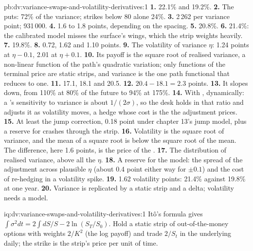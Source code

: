 \begin{solution}{pb:dv:variance-swaps-and-volatility-derivatives:1}
\textbf{1.} 22.1\% and 19.2\%.
\textbf{2.} The puts: 72\% of the variance; strikes below 80 alone 24\%.
\textbf{3.} 2\,262 per variance point; 931\,000.
\textbf{4.} 1.6 to 1.8 points, depending on the spacing.
\textbf{5.} 20.8\%.
\textbf{6.} 21.4\%: the calibrated model misses the surface's wings, which the strip weights heavily.
\textbf{7.} 19.8\%.
\textbf{8.} 0.72, 1.62 and 1.10 points.
\textbf{9.} The volatility of variance $\eta$: 1.24 points at $\eta-0.1$, 2.01 at $\eta+0.1$.
\textbf{10.} Its payoff is the square root of realised variance, a non-linear function of the path's quadratic
variation; only functions of the terminal price are static strips, and variance is the one path functional that
reduces to one.
\textbf{11.} 17.1, 18.1 and 20.5.
\textbf{12.} $20.4-18.1=2.3$ points.
\textbf{13.} It slopes down, from 110\% at 80\% of the future to 94\% at 175\%.
\textbf{14.} With , dynamically: a 's sensitivity to variance is about
$1/(2\sigma)$, so the desk holds  in that ratio and adjusts it as volatility moves, a hedge whose
cost is the  the adjustment prices.
\textbf{15.} At least the jump correction, 0.18 point under chapter 13's jump model, plus a reserve for crashes
through the strip.
\textbf{16.} Volatility is the square root of variance, and the mean of a square root is below the square root of
the mean. The difference, here 1.6 points, is the price of the .
\textbf{17.} The distribution of realised variance, above all the  $\eta$.
\textbf{18.} A reserve for the model: the spread of the adjustment across plausible $\eta$ (about 0.4 point either way for $\pm0.1$)
and the cost of re-hedging in a volatility spike.
\textbf{19.} 1.62 volatility points: 21.4\% against 19.8\% at one year.
\textbf{20.} Variance is replicated by a static strip and a delta; volatility needs a model.
\end{solution}

\begin{solution}{iq:dv:variance-swaps-and-volatility-derivatives:1}
Itô's formula gives $\int\sigma^2dt=2\int dS/S-2\ln(S_T/S_0)$. Hold a static strip of out-of-the-money options
with weights $2/K^2$ (the log payoff) and trade $2/S_t$ in the underlying daily; the strike is the strip's price
per unit of time.
\end{solution}

